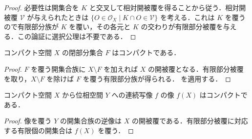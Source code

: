 \begin{proof}
必要性は開集合を $K$ と交叉して相対開被覆を得ることから従う．相対開被覆 $\mathcal V$ が与えられたときは $\{O\in\mathcal O_X\mid K\cap O\in\mathcal V\}$ を考える．これは $K$ を覆うので有限部分族が $K$ を覆い，その各元と $K$ の交わりが有限部分被覆を与える．この論証に選択公理は不要である．
\end{proof}
\begin{prop}[閉部分空間のコンパクト性]
コンパクト空間 $X$ の閉部分集合 $F$ はコンパクトである．
\end{prop}
\begin{proof}
$F$ を覆う開集合族に $X\setminus F$ を加えれば $X$ の開被覆となる．有限部分被覆を取り，$X\setminus F$ を除けば $F$ を覆う有限部分族が得られる． を適用する．
\end{proof}
\begin{prop}[コンパクト性の連続像による保存]
コンパクト空間 $X$ から位相空間 $Y$ への連続写像 $f$ の像 $f(X)$ はコンパクトである．
\end{prop}
\begin{proof}
像を覆う $Y$ の開集合族の逆像は $X$ の開被覆である．有限部分被覆に対応する有限個の開集合は $f(X)$ を覆う．
\end{proof}
